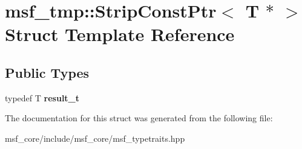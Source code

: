 \hypertarget{structmsf__tmp_1_1StripConstPtr_3_01T_01_5_01_4}{\section{msf\-\_\-tmp\-:\-:Strip\-Const\-Ptr$<$ T $\ast$ $>$ Struct Template Reference}
\label{structmsf__tmp_1_1StripConstPtr_3_01T_01_5_01_4}
}
\subsection*{Public Types}
\begin{DoxyCompactItemize}
\item 
\hypertarget{structmsf__tmp_1_1StripConstPtr_3_01T_01_5_01_4_a488d62f2859f809b9dc13e5e99a81582}{typedef T {\bfseries result\-\_\-t}}\label{structmsf__tmp_1_1StripConstPtr_3_01T_01_5_01_4_a488d62f2859f809b9dc13e5e99a81582}

\end{DoxyCompactItemize}


The documentation for this struct was generated from the following file\-:\begin{DoxyCompactItemize}
\item 
msf\-\_\-core/include/msf\-\_\-core/msf\-\_\-typetraits.\-hpp\end{DoxyCompactItemize}
